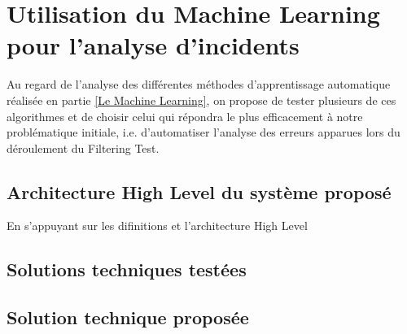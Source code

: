 \chapter{Utilisation du Machine Learning pour l'analyse d'incidents}
\label{Utilisation du Machine Learning pour l'analyse d'incidents}
\thispagestyle{fancy}

Au regard de l'analyse des différentes méthodes d'apprentissage automatique réalisée en partie \ref{Le Machine Learning}, on propose de tester plusieurs de ces algorithmes et de choisir celui qui répondra le plus efficacement à notre problématique initiale, i.e. d'automatiser l'analyse des erreurs apparues lors du déroulement du Filtering Test.

\section{Architecture High Level du système proposé}
\label{Utilisation du Machine Learning pour l'analyse d'incidents: Achitecture High Level du système proposé}
En s'appuyant sur les difinitions et l'architecture High Level 
\section{Solutions techniques testées}
\label{Utilisation du Machine Learning pour l'analyse d'incidents: Solutions techniques testées}

\section{Solution technique proposée}
\label{Utilisation du Machine Learning pour l'analyse d'incidents: Solution technique proposée}

